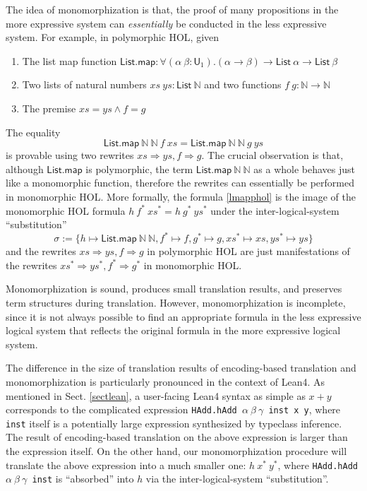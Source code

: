   The idea of monomorphization is that, the proof of many propositions in the more expressive
  system can \textit{essentially} be conducted in the less expressive system. For example,
  in polymorphic HOL, given
  \begin{enumerate}
    \item The list map function $\mathsf{List.map} : \forall (\alpha \ \beta : \mathsf{U}_1). (\alpha \to \beta) \to \mathsf{List} \ \alpha \to \mathsf{List} \ \beta$
    \item Two lists of natural numbers $xs \ ys : \mathsf{List} \ \mathbb{N}$ and two functions $f \ g : \mathbb{N} \to \mathbb{N}$
    \item The premise $xs = ys \land f = g$
  \end{enumerate}
  The equality
  \begin{equation}\label{lmapphol}
    \mathsf{List.map} \ \mathbb{N} \ \mathbb{N} \ f \ xs = \mathsf{List.map} \ \mathbb{N} \ \mathbb{N} \ g \ ys
  \end{equation}
  is provable using two rewrites $xs \Rightarrow ys, f \Rightarrow g$. The crucial observation is that, although $\textsf{List.map}$ is polymorphic, the term
  $\mathsf{List.map} \ \mathbb{N} \ \mathbb{N}$ as a whole behaves just like a monomorphic function,
  therefore the rewrites can essentially be performed in monomorphic HOL. More formally,
  the formula \eqref{lmapphol} is the image of the monomorphic HOL formula $h \ f^* \ xs^* = h \ g^* \ ys^*$
  under the inter-logical-system ``substitution''
  $$\sigma := \{h \mapsto \mathsf{List.map} \ \mathbb{N} \ \mathbb{N},
    f^* \mapsto f, g^* \mapsto g, xs^* \mapsto xs, ys^* \mapsto ys\}$$
  and the rewrites $xs \Rightarrow ys, f \Rightarrow g$ in polymorphic HOL are just manifestations of the
  rewrites $xs^* \Rightarrow ys^*, f^* \Rightarrow g^*$ in monomorphic HOL.
  
  Monomorphization is sound, produces small translation results, and preserves
  term structures during translation. However, monomorphization is incomplete,
  since it is not always possible to find an appropriate formula in the less
  expressive logical system that reflects the original formula in the more expressive logical system.


  The difference in the size of translation results of encoding-based translation
  and monomorphization is particularly pronounced in the context of Lean4. As mentioned in Sect. \ref{sectlean},
  a user-facing Lean4 syntax as simple as $x + y$ corresponds to
  the complicated expression \texttt{HAdd.hAdd $\alpha \ \beta \ \gamma$ inst x y}, where \texttt{inst}
  itself is a potentially large expression synthesized by typeclass inference. The result
  of encoding-based translation on the above expression is larger than the expression itself.
  On the other hand, our monomorphization procedure will translate the above expression
  into a much smaller one: $h \ x^* \ y^*$, where \texttt{HAdd.hAdd $\alpha \ \beta \ \gamma$ inst}
  is ``absorbed'' into $h$ via the inter-logical-system ``substitution''.